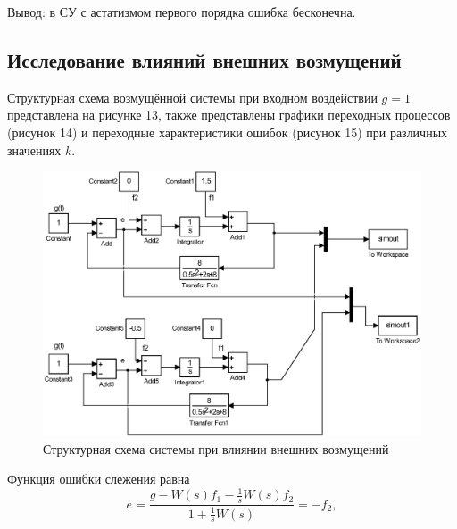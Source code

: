 \documentclass[a4paper,12pt]{article} %
\begin{document}
\par Вывод: в СУ с астатизмом первого порядка ошибка бесконечна.
\newpage
\begin{center}
\section{Исследование влияний внешних возмущений}
\end{center}\par
Структурная схема возмущённой системы при входном воздействии $g=1$ представлена на рисунке 13, также представлены графики переходных процессов (рисунок 14) и переходные характеристики ошибок (рисунок 15) при различных значениях $k$.
\begin{figure}[H]
    \centering
    \includegraphics[width=1\linewidth]{scheme/scheme4.eps}
    \caption{Структурная схема системы при влиянии внешних возмущений}
\end{figure}
Функция ошибки слежения равна
\begin{equation}
e = {\frac{g - W(s)f_1 - \displaystyle{\frac{1}{s}}W(s)f_2}{1 + \displaystyle{\frac{1}{s}}W(s)}}=-f_2,
\end{equation}
\end{document}
